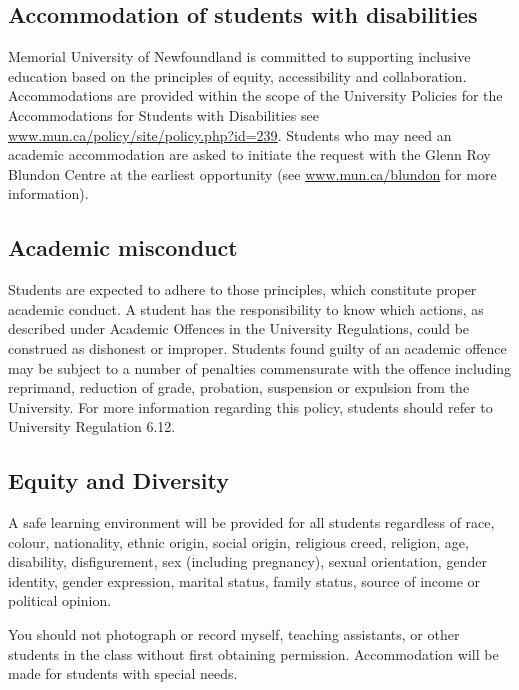 \documentclass[]{book}
\begin{document}
\subsection{Accommodation of students with
disabilities}\label{accommodation-of-students-with-disabilities}

Memorial University of Newfoundland is committed to supporting inclusive
education based on the principles of equity, accessibility and
collaboration. Accommodations are provided within the scope of the
University Policies for the Accommodations for Students with
Disabilities see \url{www.mun.ca/policy/site/policy.php?id=239}.
Students who may need an academic accommodation are asked to initiate
the request with the Glenn Roy Blundon Centre at the earliest
opportunity (see \url{www.mun.ca/blundon} for more information).

\subsection{Academic misconduct}\label{academic-misconduct}

Students are expected to adhere to those principles, which constitute
proper academic conduct. A student has the responsibility to know which
actions, as described under Academic Offences in the University
Regulations, could be construed as dishonest or improper. Students found
guilty of an academic offence may be subject to a number of penalties
commensurate with the offence including reprimand, reduction of grade,
probation, suspension or expulsion from the University. For more
information regarding this policy, students should refer to University
Regulation 6.12.

\subsection{Equity and Diversity}\label{equity-and-diversity}

A safe learning environment will be provided for all students regardless
of race, colour, nationality, ethnic origin, social origin, religious
creed, religion, age, disability, disfigurement, sex (including
pregnancy), sexual orientation, gender identity, gender expression,
marital status, family status, source of income or political opinion.

You should not photograph or record myself, teaching assistants, or
other students in the class without first obtaining permission.
Accommodation will be made for students with special needs.
\end{document}
